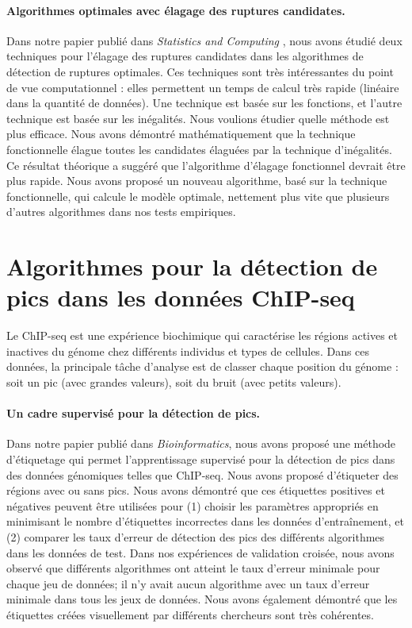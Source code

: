 \documentclass{article}
\begin{document}
\paragraph{Algorithmes optimales avec élagage des ruptures
  candidates.} Dans notre papier publié dans \emph{Statistics and
  Computing} \citep{fpop}, nous avons étudié deux techniques pour
l'élagage des ruptures candidates dans les algorithmes de détection de
ruptures optimales. Ces techniques sont très intéressantes du point de
vue computationnel : elles permettent un temps de calcul très rapide
(linéaire dans la quantité de données). Une technique est basée sur
les fonctions, et l'autre technique est basée sur les inégalités. Nous
voulions étudier quelle méthode est plus efficace. Nous avons démontré
mathématiquement que la technique fonctionnelle élague toutes les
candidates élaguées par la technique d'inégalités. Ce résultat
théorique a suggéré que l'algorithme d'élagage fonctionnel devrait
être plus rapide. Nous avons proposé un nouveau algorithme, basé sur
la technique fonctionnelle, qui calcule le modèle optimale, nettement
plus vite que plusieurs d'autres algorithmes dans nos tests
empiriques.

\section{Algorithmes pour la détection de pics dans les données ChIP-seq}
Le ChIP-seq est une expérience biochimique qui caractérise les
régions actives et inactives du génome chez différents individus et
types de cellules. Dans ces données, la principale tâche d'analyse est
de classer chaque position du génome : soit un pic (avec grandes
valeurs), soit du bruit (avec petits valeurs).

\paragraph{Un cadre supervisé pour la détection de pics.} Dans notre
papier publié dans \emph{Bioinformatics}\citep{HOCKING-chipseq}, nous
avons proposé une méthode d'étiquetage qui permet l'apprentissage
supervisé pour la détection de pics dans des données génomiques telles
que ChIP-seq. Nous avons proposé d'étiqueter des régions
avec ou sans pics. Nous avons démontré que ces étiquettes positives et
négatives peuvent être utilisées pour (1) choisir les paramètres
appropriés en minimisant le nombre d'étiquettes incorrectes dans les
données d'entraînement, et (2) comparer les taux d'erreur de détection
des pics des différents algorithmes dans les données de test. Dans nos
expériences de validation croisée, nous avons observé que différents
algorithmes ont atteint le taux d'erreur minimale pour chaque jeu de
données; il n'y avait aucun algorithme avec un taux d'erreur minimale
dans tous les jeux de données. Nous avons également démontré que les
étiquettes créées visuellement par différents chercheurs sont très
cohérentes.
\end{document}
